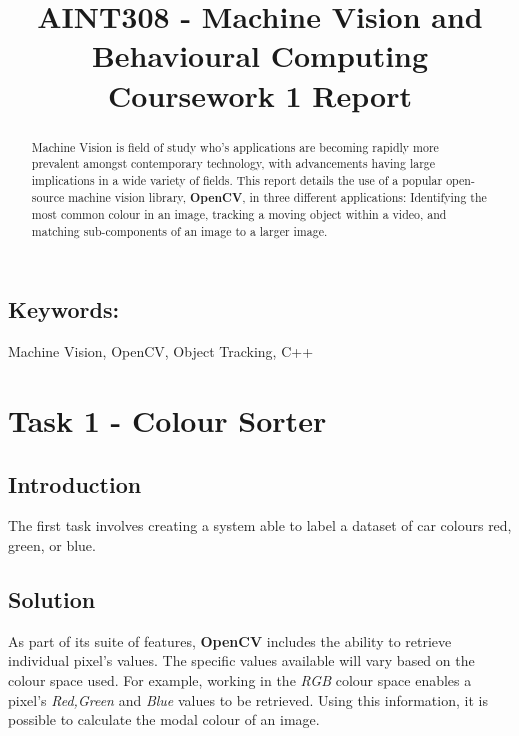\documentclass[conference]{IEEEtran}
\begin{document}
%
\title{AINT308 - Machine Vision and Behavioural Computing\\Coursework 1 Report}


\author{
}



\maketitle


\begin{abstract}
 Machine Vision is field of study who's applications are becoming rapidly more prevalent amongst contemporary technology, with advancements having large implications in a wide variety of fields. This report details the use of a popular open-source machine vision library, \textbf{OpenCV}, in three different applications: Identifying the most common colour in an image, tracking a moving object within a video, and matching sub-components of an image to a larger image.
\end{abstract}
\subsection*{Keywords:}
Machine Vision, OpenCV, Object Tracking, C++

\section{Task 1 - Colour Sorter}
\subsection{Introduction}
The first task involves creating a system able to label a dataset of car colours red, green, or blue.
\subsection{Solution}
As part of its suite of features, \textbf{OpenCV} includes the ability to retrieve individual pixel's values. The specific values available will vary based on the colour space used. For example, working in the \textit{RGB} colour space enables a pixel's \textit{Red,Green} and \textit{Blue} values to be retrieved. Using this information, it is possible to calculate the modal colour of an image. 
\end{document}
